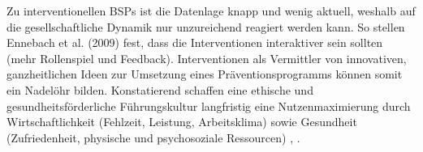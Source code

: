 \documentclass[a4paper]{article}
\begin{document}
Zu interventionellen BSPs ist die Datenlage knapp und wenig aktuell, weshalb auf die gesellschaftliche Dynamik nur unzureichend reagiert werden kann. So stellen Ennebach et al. (2009) fest, dass die Interventionen interaktiver sein sollten (mehr Rollenspiel und Feedback). Interventionen als Vermittler von innovativen, ganzheitlichen Ideen zur Umsetzung eines Präventionsprogramms können somit ein Nadelöhr bilden. Konstatierend schaffen eine ethische und gesundheitsförderliche Führungskultur langfristig eine Nutzenmaximierung durch Wirtschaftlichkeit (Fehlzeit, Leistung, Arbeitsklima) sowie Gesundheit (Zufriedenheit, physische und psychosoziale Ressourcen) , .
\newpage
\renewcommand{\refname}{Literaturverzeichnis}


\end{document}
